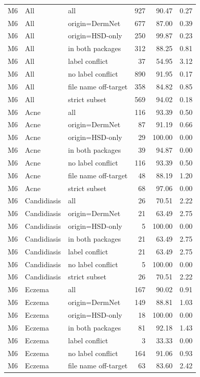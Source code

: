 \begin{tabular}{lllrrr}
M6 & All & all & 927 & 90.47 & 0.27 \\
M6 & All & origin=DermNet & 677 & 87.00 & 0.39 \\
M6 & All & origin=HSD-only & 250 & 99.87 & 0.23 \\
M6 & All & in both packages & 312 & 88.25 & 0.81 \\
M6 & All & label conflict & 37 & 54.95 & 3.12 \\
M6 & All & no label conflict & 890 & 91.95 & 0.17 \\
M6 & All & file name off-target & 358 & 84.82 & 0.85 \\
M6 & All & strict subset & 569 & 94.02 & 0.18 \\
M6 & Acne & all & 116 & 93.39 & 0.50 \\
M6 & Acne & origin=DermNet & 87 & 91.19 & 0.66 \\
M6 & Acne & origin=HSD-only & 29 & 100.00 & 0.00 \\
M6 & Acne & in both packages & 39 & 94.87 & 0.00 \\
M6 & Acne & no label conflict & 116 & 93.39 & 0.50 \\
M6 & Acne & file name off-target & 48 & 88.19 & 1.20 \\
M6 & Acne & strict subset & 68 & 97.06 & 0.00 \\
M6 & Candidiasis & all & 26 & 70.51 & 2.22 \\
M6 & Candidiasis & origin=DermNet & 21 & 63.49 & 2.75 \\
M6 & Candidiasis & origin=HSD-only & 5 & 100.00 & 0.00 \\
M6 & Candidiasis & in both packages & 21 & 63.49 & 2.75 \\
M6 & Candidiasis & label conflict & 21 & 63.49 & 2.75 \\
M6 & Candidiasis & no label conflict & 5 & 100.00 & 0.00 \\
M6 & Candidiasis & strict subset & 26 & 70.51 & 2.22 \\
M6 & Eczema & all & 167 & 90.02 & 0.91 \\
M6 & Eczema & origin=DermNet & 149 & 88.81 & 1.03 \\
M6 & Eczema & origin=HSD-only & 18 & 100.00 & 0.00 \\
M6 & Eczema & in both packages & 81 & 92.18 & 1.43 \\
M6 & Eczema & label conflict & 3 & 33.33 & 0.00 \\
M6 & Eczema & no label conflict & 164 & 91.06 & 0.93 \\
M6 & Eczema & file name off-target & 63 & 83.60 & 2.42 \\

\end{tabular}
